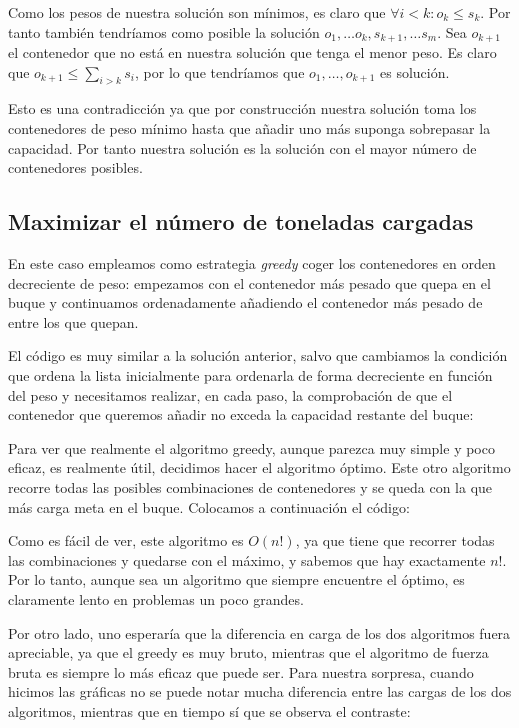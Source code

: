 Como los pesos de nuestra solución son mínimos, es claro que $\forall i < k: o_k \leq s_k$.
Por tanto también tendríamos como posible la solución $o_1, \dots o_k, s_{k+1}, \dots s_m$.
Sea $o_{k+1}$ el contenedor que no está en nuestra solución que tenga el menor peso.
Es claro que $o_{k+1} \leq \sum_{i > k} s_i$, por lo que tendríamos que
$o_1, \dots, o_{k+1}$ es solución.

Esto es una contradicción ya que por construcción nuestra solución toma los contenedores
de peso mínimo hasta que añadir uno más suponga sobrepasar la capacidad. Por tanto nuestra
solución es la solución con el mayor número de contenedores posibles.

\subsection{Maximizar el número de toneladas cargadas}

En este caso empleamos como estrategia \textit{greedy} coger los contenedores en orden
decreciente de peso: empezamos con el contenedor más pesado que quepa en el buque
y continuamos ordenadamente añadiendo el contenedor más pesado de entre los que quepan.

El código es muy similar a la solución anterior, salvo que cambiamos la condición
que ordena la lista inicialmente para ordenarla de forma decreciente en función del peso
y necesitamos realizar, en cada paso, la comprobación de que el contenedor que
queremos añadir no exceda la capacidad restante del buque:



Para ver que realmente el algoritmo greedy, aunque parezca muy simple y poco eficaz, es realmente útil, decidimos hacer el algoritmo óptimo. Este otro algoritmo recorre todas las posibles combinaciones de contenedores y se queda con la que más carga meta en el buque. Colocamos a continuación el código:



Como es fácil de ver, este algoritmo es $O(n!)$, ya que tiene que recorrer todas las combinaciones y quedarse con el máximo, y sabemos que hay exactamente $n!$. Por lo tanto, aunque sea un algoritmo que siempre encuentre el óptimo, es claramente lento en problemas un poco grandes.

Por otro lado, uno esperaría que la diferencia en carga de los dos algoritmos fuera apreciable, ya que el greedy es muy bruto, mientras que el algoritmo de fuerza bruta es siempre lo más eficaz que puede ser. Para nuestra sorpresa, cuando hicimos las gráficas no se puede notar mucha diferencia entre las cargas de los dos algoritmos, mientras que en tiempo sí que se observa el contraste:


